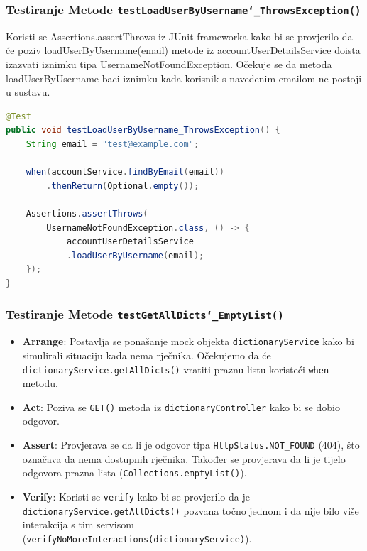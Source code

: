 			\subsubsection{Testiranje Metode \texttt{testLoadUserByUsername\char`_ThrowsException()}}
			
			Koristi se Assertions.assertThrows iz JUnit frameworka kako bi se provjerilo da će poziv loadUserByUsername(email) metode iz accountUserDetailsService doista izazvati iznimku tipa UsernameNotFoundException. Očekuje se da metoda loadUserByUsername baci iznimku kada korisnik s navedenim emailom ne postoji u sustavu.
			
			\begin{lstlisting}[language=Java]
@Test
public void testLoadUserByUsername_ThrowsException() {
	String email = "test@example.com";
	
	when(accountService.findByEmail(email))
		.thenReturn(Optional.empty());
	
	Assertions.assertThrows(
		UsernameNotFoundException.class, () -> {
			accountUserDetailsService
			.loadUserByUsername(email);
	});
}
			\end{lstlisting}
			
			\subsubsection{Testiranje Metode \texttt{testGetAllDicts\char`_EmptyList()}}	
			
			\begin{itemize}
				\item \textbf{Arrange}: Postavlja se ponašanje mock objekta \texttt{dictionaryService} kako bi simulirali situaciju kada nema rječnika. Očekujemo da će \texttt{dictionaryService.getAllDicts()} vratiti praznu listu koristeći \texttt{when} metodu.
				
				\item \textbf{Act}: Poziva se \texttt{GET()} metoda iz \texttt{dictionaryController} kako bi se dobio odgovor.
				
				\item \textbf{Assert}: Provjerava se da li je odgovor tipa \texttt{HttpStatus.NOT\_FOUND} (404), što označava da nema dostupnih rječnika. Također se provjerava da li je tijelo odgovora prazna lista (\texttt{Collections.emptyList()}).
				
				\item \textbf{Verify}: Koristi se \texttt{verify} kako bi se provjerilo da je \texttt{dictionaryService.getAllDicts()} pozvana točno jednom i da nije bilo više interakcija s tim servisom \\(\texttt{verifyNoMoreInteractions(dictionaryService)}).
			\end{itemize}
			
